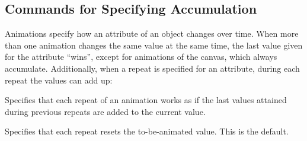 \subsection{Commands for Specifying Accumulation}

Animations specify how an attribute of an object changes over time. When more
than one animation changes the same value at the same time, the last value
given for the attribute ``wins'', except for animations of the canvas, which
always accumulate. Additionally, when a repeat is specified for an attribute,
during each repeat the values can add up:

\begin{command}{\pgfsysanimkeyaccumulate{}}
\end{command}
\begin{command}{\pgfsys@animation@accumulate{}}
    Specifies that each repeat of an animation works as if the last values
    attained during previous repeats are added to the current value.
\begin{codeexample}[
    width=6cm,
    preamble={\usetikzlibrary{animations}},
    animation list={1,2,3,4,5,6,7,8},
]
\end{codeexample}
\end{command}

\begin{command}{\pgfsysanimkeynoaccumulate{}}
\end{command}
\begin{command}{\pgfsys@animation@noaccumulate{}}
    Specifies that each repeat resets the to-be-animated value. This is the
    default.
\begin{codeexample}[
    width=6cm,
    preamble={\usetikzlibrary{animations}},
    animation list={1,2,3,4,5,6,7,8},
]
\end{codeexample}
\end{command}


